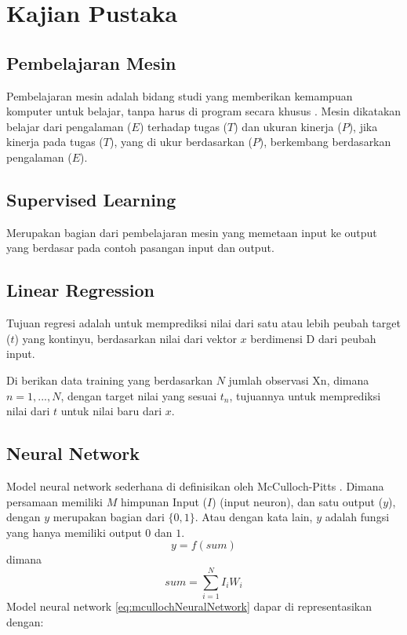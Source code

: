 \chapter{Kajian Pustaka}


\section{Pembelajaran Mesin}
    Pembelajaran mesin adalah bidang studi yang memberikan kemampuan komputer untuk belajar, tanpa harus di program secara khusus \cite{ArthurLSamuel1959}. Mesin dikatakan belajar dari pengalaman ($E$) terhadap tugas ($T$) dan ukuran kinerja ($P$), jika kinerja pada tugas ($T$), yang di ukur berdasarkan ($P$), berkembang berdasarkan pengalaman ($E$).

\section{Supervised Learning}
    Merupakan bagian dari pembelajaran mesin yang memetaan input ke output yang berdasar pada contoh pasangan input dan output\cite{AIPeterNorvig}.

\section{Linear Regression}
    Tujuan regresi adalah untuk memprediksi nilai dari satu atau lebih peubah target ($t$) yang kontinyu, berdasarkan nilai dari vektor $x$ berdimensi D dari peubah input\cite[halaman~137]{MLBishop}.

    Di berikan data training yang berdasarkan $N$ jumlah observasi {Xn}, dimana $n = 1, ..., N$, dengan target nilai yang sesuai {$t_n$}, tujuannya untuk memprediksi nilai dari $t$ untuk nilai baru dari $x$.

\section{Neural Network}
    Model neural network sederhana di definisikan oleh McCulloch-Pitts \cite{McCulloch1943}. Dimana persamaan memiliki $M$ himpunan Input ($I$) (input neuron), dan satu output ($y$), dengan $y$ merupakan bagian dari $\{0,1\}$. Atau dengan kata lain, $y$ adalah fungsi yang hanya memiliki output $0$ dan $1$.
    \begin{equation}
        y = f(sum)
    \end{equation}
    dimana
    \begin{equation}
    \label{eq:mcullochNeuralNetwork}
        sum = \sum_{i=1}^N I_iW_i
    \end{equation}
    Model neural network \ref{eq:mcullochNeuralNetwork} dapar di representasikan dengan:
    

